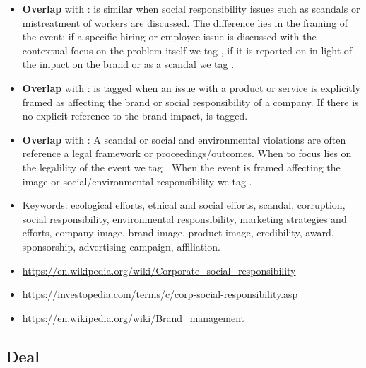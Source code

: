 \begin{itemize}[noitemsep,leftmargin=*]
	\item \hypertarget{csrbrandvsemployment}{\textbf{Overlap} with :  is similar when social responsibility issues such as scandals or mistreatment of workers are discussed. The difference lies in the framing of the event: if a specific hiring or employee issue is discussed with the contextual focus on the problem itself we tag , if it is reported on in light of the impact on the brand or as a scandal we tag .}
    \item \hypertarget{csrbrandvsproductservice}{\textbf{Overlap} with :  is tagged when an issue with a product or service is explicitly framed as affecting the brand or social responsibility of a company. If there is no explicit reference to the brand impact,  is tagged.}
    \item \hypertarget{csrbrandvslegal}{\textbf{Overlap} with : A scandal or social and environmental violations are often reference a legal framework or proceedings/outcomes. When to focus lies on the legalility of the event we tag . When the event is framed affecting the image or social/environmental responsibility we tag .}
	\item Keywords: ecological efforts, ethical and social efforts, scandal, corruption, social responsibility, environmental responsibility, marketing strategies and efforts, company image, brand image, product image, credibility, award, sponsorship, advertising campaign, affiliation.
	\item \url{https://en.wikipedia.org/wiki/Corporate_social_responsibility}
	\item \url{https://investopedia.com/terms/c/corp-social-responsibility.asp}
	\item \url{https://en.wikipedia.org/wiki/Brand_management}
\end{itemize}

\vspace{0.5cm}

\subsection{Deal}

